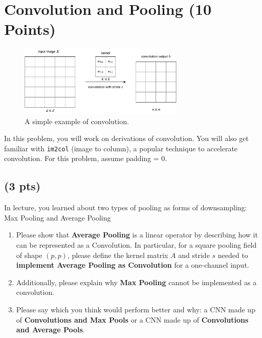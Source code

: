 \section{Convolution and Pooling (10 Points)}

\begin{figure}[H]
    \centering
    \includegraphics[width=0.7\textwidth]{images/conv.pdf}
    \caption{A simple example of convolution.}
    \label{fig:conv}
\end{figure}

In this problem, you will work on derivations of convolution. You will also get familiar with \texttt{im2col} (image to column), a popular technique to accelerate convolution. For this problem, assume padding = 0.


\subsection{(3 pts)} 
In lecture, you learned about two types of pooling as forms of downsampling: Max Pooling and Average Pooling
\begin{enumerate}
    \item
    Please show that \textbf{Average Pooling} is a linear operator by describing how it can be represented as a Convolution. In particular, for a square pooling field of shape $(p,p)$, please define the kernel matrix $A$ and stride $s$ needed to \textbf{implement Average Pooling as Convolution} for a one-channel input.
    \item
    Additionally, please explain why \textbf{Max Pooling} cannot be implemented as a convolution.
    \item
    Please say which you think would perform better and why: a CNN made up of \textbf{Convolutions and Max Pools} or a CNN made up of \textbf{Convolutions and Average Pools}.
\end{enumerate}
\newpage
    
